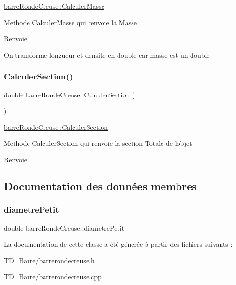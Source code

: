 \hyperlink{classbarre_ronde_creuse_a5c6242830085be53d968cb23602ea2b1}{barre\+Ronde\+Creuse\+::\+Calculer\+Masse} 

Methode Calculer\+Masse qui renvoie la Masse \begin{DoxyReturn}{Renvoie}

\end{DoxyReturn}
On transforme longueur et densite en double car masse est un double \mbox{\label{classbarre_ronde_creuse_adbd7d165624ef3580e7c85cd777cd95f}} 
\subsubsection{\texorpdfstring{Calculer\+Section()}{CalculerSection()}}
{\footnotesize\ttfamily double barre\+Ronde\+Creuse\+::\+Calculer\+Section (\begin{DoxyParamCaption}{ }\end{DoxyParamCaption})}



\hyperlink{classbarre_ronde_creuse_adbd7d165624ef3580e7c85cd777cd95f}{barre\+Ronde\+Creuse\+::\+Calculer\+Section} 

Methode Calculer\+Section qui renvoie la section Totale de l\textquotesingle{}objet \begin{DoxyReturn}{Renvoie}

\end{DoxyReturn}


\subsection{Documentation des données membres}
\mbox{\label{classbarre_ronde_creuse_a78869588e151b3b0e3b1938eb8ebd0a0}} 
\subsubsection{\texorpdfstring{diametre\+Petit}{diametrePetit}}
{\footnotesize\ttfamily double barre\+Ronde\+Creuse\+::diametre\+Petit\hspace{0.3cm}{\ttfamily [private]}}



La documentation de cette classe a été générée à partir des fichiers suivants \+:\begin{DoxyCompactItemize}
\item 
T\+D\+\_\+\+Barre/\hyperlink{barrerondecreuse_8h}{barrerondecreuse.\+h}\item 
T\+D\+\_\+\+Barre/\hyperlink{barrerondecreuse_8cpp}{barrerondecreuse.\+cpp}\end{DoxyCompactItemize}
